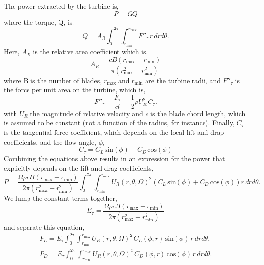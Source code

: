The power extracted by the turbine is, 
\begin{equation}
 P = \Omega Q
\end{equation}
where the torque, Q, is\cite{morgado2014validation}, 
\begin{equation}
 Q = A_R \int_0^{2\pi} \int_{r_{\text{min}}}^{r_{\text{max}}} F''_{\tau}\, r\, dr d\theta.
\end{equation}
Here, $A_R$ is the relative area coefficient which is, 
\begin{equation}
A_R = \frac{c B (r_{\text{max}}-r_{\text{min}})}{\pi(r_{\text{max}}^2-r_{\text{min}}^2)}
\end{equation}
where B is the number of blades, $r_{\text{max}}$ and $r_{\text{min}}$
are the turbine radii, and $F''_{\tau}$ is the force per unit
area on the turbine, which is, 
\begin{equation}
 F''_{\tau} = \frac{F_{\tau}}{cl}= \frac{1}{2}\rho U_R^2 \, C_{\tau}.
\end{equation}
with $U_R$ the magnitude of relative velocity and $c$ is the blade chord
length, which is assumed to be constant (not a function of the radius,
for instance). Finally, $C_{\tau}$ is the tangential force coefficient,
which depends on the local lift and drap coefficients, and the
flow angle, $\phi$, 
\begin{equation}
 C_{\tau} = C_L \,\text{sin}(\phi) + C_D \,\text{cos}(\phi)
\end{equation}
Combining the equations above results in an expression for the power
that explicitly depends on the lift and drag coefficients, 
\begin{equation*}
 P = \frac{\Omega \rho c B (r_{\text{max}}-r_{\text{min}})}{2 \pi(r_{\text{max}}^2-r_{\text{min}}^2)}
\int_0^{2\pi}
\int_{r_{\text{min}}}^{r_{\text{max}}} U_R(r,\theta,\Omega)^2 \left(C_L
						     \,\text{sin}(\phi)
						     + C_D
						     \,\text{cos}(\phi)
						    \right) r\,dr d\theta. 
\end{equation*}
We lump the constant terms together, 
\begin{equation}
E_{\tau} = \frac{\Omega \rho c B (r_{\text{max}}-r_{\text{min}})}{2
 \pi(r_{\text{max}}^2-r_{\text{min}}^2)}
\end{equation}
 and separate this equation, 
\begin{align}
 P_L = E_\tau
 \int_0^{2\pi}
  \int_{r_{\text{min}}}^{r_{\text{max}}} U_R(r,\theta,\Omega)^2 \, C_L(\phi,r)
 \,\text{sin}(\phi)\, r\,dr d\theta,  \label{lift} \\
 P_D = E_\tau
 \int_0^{2\pi}
  \int_{r_{\text{min}}}^{r_{\text{max}}} U_R(r,\theta,\Omega)^2 \, C_D(\phi,r) \,\text{cos}(\phi)\, r\,dr d\theta. \label{drag}
\end{align}
